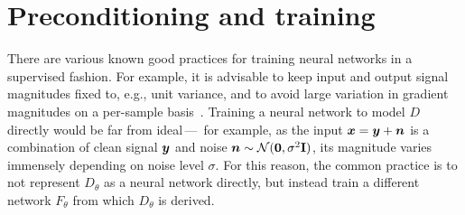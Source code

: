 \documentclass{article}
\begin{document}
\vspace*{-1.5mm}
\section{Preconditioning and training}
\label{sec:training}
\vspace*{-0.5mm}

There are various known good practices for training neural networks in a supervised fashion.
For example, it is advisable to keep input and output signal magnitudes fixed to, e.g., unit variance, and to
  avoid large variation in gradient magnitudes on a per-sample basis~\cite{Bishop1995book,Huang2020normalize}.
Training a neural network to model $D$ directly would be far from ideal\,---\,%
  for example, as the input $\boldsymbol{x}=\boldsymbol{y}+\boldsymbol{n}$ is a combination of clean signal $\boldsymbol{y}$ and noise $\boldsymbol{n}\sim\mathcal{N}(\mathbf{0},\sigma^2 \mathbf{I})$,
  its magnitude varies immensely depending on noise level $\sigma$.
For this reason, the common practice is to not represent $D_\theta$ as a neural network directly, but instead train a different network $F_\theta$ from which $D_\theta$ is derived.
\end{document}
